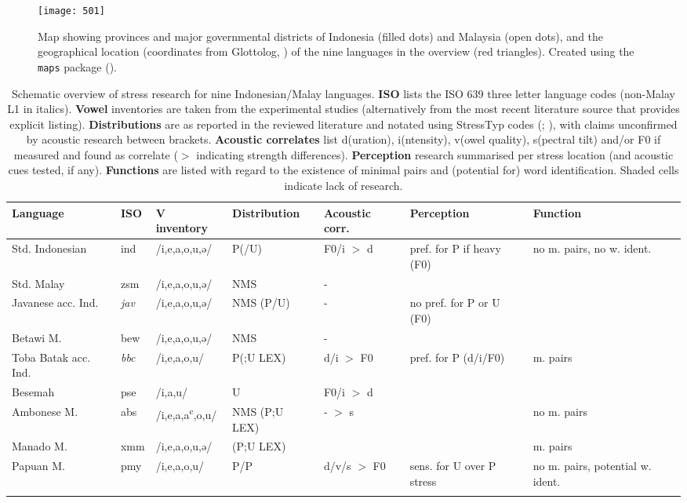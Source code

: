 \begin{figure} 
\texttt{[image: 501]}
\caption{Map showing provinces and major governmental districts of Indonesia (filled dots) and Malaysia (open dots), and the geographical location (coordinates from Glottolog, \citealt{hammarstrom_glottolog_2021}) of the nine languages in the overview (red triangles). Created using the \texttt{maps} package (\citealt{becker_maps_2003}).}
\label{fig501}
\end{figure}

\newpage
\begin{table}
\footnotesize
\captionsetup{width=.8\linewidth}
\caption{Schematic overview of stress research for nine Indonesian/Malay languages. \textbf{ISO} lists the ISO 639 three letter language codes (non-Malay L1 in italics). \textbf{Vowel} inventories are taken from the experimental studies (alternatively from the most recent literature source that provides explicit listing). \textbf{Distributions} are as reported in the reviewed literature and notated using StressTyp codes (\citealt{goedemans_stresstyp2_2020}; \citealt{hulst_survey_2010}), with claims unconfirmed by acoustic research between brackets. \textbf{Acoustic correlates} list d(uration), i(ntensity), v(owel quality), s(pectral tilt) and/or F0 if measured and found as correlate ($>$ indicating strength differences). \textbf{Perception} research summarised per stress location (and acoustic cues tested, if any). \textbf{Functions} are listed with regard to the existence of minimal pairs and (potential for) word identification. Shaded cells indicate lack of research.}
\label{tab51}
\footnotesize
\begin{tabularx}{\textwidth}{Qlll@{}l QQ}
\lsptoprule
 Language & ISO & V inventory & Distribution & Acoustic corr. & Perception & Function\\
\midrule
 Std. Indonesian & ind & /i,e,a,o,u,ə/ & P(/U) & F0/i $>$ d & pref. for P if heavy (F0) & no m. pairs, no w. ident.\\
 Std. Malay & zsm & /i,e,a,o,u,ə/ & NMS & - &  & \\
 Javanese acc. Ind. & \textit{jav} & /i,e,a,o,u,ə/ & NMS (P/U) & - & no pref. for P or U (F0) & \\
 Betawi M. & bew & /i,e,a,o,u,ə/ & NMS & - &  & \\
 Toba Batak acc. Ind. & \textit{bbc} & /i,e,a,o,u/ & P(;U LEX) & d/i $>$ F0 & pref. for P (d/i/F0) & m. pairs\\
 Besemah & pse & /i,a,u/ & U & F0/i $>$ d &  & \\
 Ambonese M. & abs & /i,e,a,a\textsuperscript{c},o,u/ & NMS (P;U LEX) & - $>$ s &  & no m. pairs\\
 Manado M. & xmm & /i,e,a,o,u,ə/ & (P;U LEX) &  &  & m. pairs\\
 Papuan M. & pmy & /i,e,a,o,u/ & P/P & d/v/s $>$ F0 & sens. for U over P stress & no m. pairs, potential w. ident.\\
\lspbottomrule
\end{tabularx}
\end{table}

